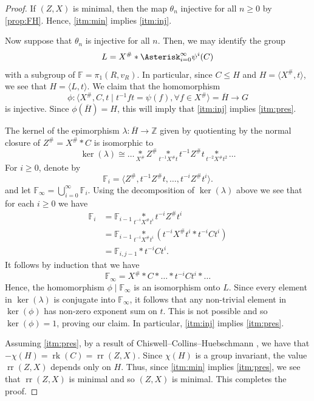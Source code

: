 \documentclass[11pt, a4paper]{amsart}
\theoremstyle{definition}
\newcommand{\isom}{\cong}
\newcommand{\F}{\mathbb{F}}
\newcommand{\Z}{\mathbb{Z}}
\DeclareMathOperator{\rk}{rk}
\DeclareMathOperator{\rr}{rr}
\begin{document}
\begin{proof}
If $(Z, X)$ is minimal, then the map $\theta_n$ injective for all $n\geqslant 0$ by \cref{prop:FH}. Hence, \cref{itm:min} implies \cref{itm:inj}.

Now suppose that $\theta_n$ is injective for all $n$. Then, we may identify the group
\[
L = X^{\#}*\Asterisk_{i=0}^{\infty}\psi^i(C)
\]
with a subgroup of $\F = \pi_1(R, v_R)$. In particular, since $C\leqslant H$ and $H = \langle X^{\#}, t\rangle$, we see that $H = \langle L, t\rangle$. We claim that the homomorphism
\[
\phi\colon \langle X^{\#}, C, t \mid t^{-1}ft = \psi(f), \forall f\in X^{\#}\rangle = \overline{H} \to G
\]
is injective. Since $\phi(\overline{H}) = H$, this will imply that \cref{itm:inj} implies \cref{itm:pres}.

The kernel of the epimorphism $\lambda\colon\overline{H}\to \Z$ given by quotienting by the normal closure of $Z^{\#} = X^{\#}*C$ is isomorphic to
\[
\ker(\lambda) \isom \ldots \underset{X^{\#}}{*}Z^{\#}\underset{t^{-1}X^{\#}t}{*}t^{-1}Z^{\#}t\underset{t^{-2}X^{\#}t^2}{*}\ldots
\]
For $i\geqslant 0$, denote by
\[
\F_{i} = \langle Z^{\#}, t^{-1}Z^{\#}t, \ldots, t^{-i}Z^{\#}t^i\rangle.
\]
and let $\F_{\infty} = \bigcup_{i=0}^{\infty}\F_i$. Using the decomposition of $\ker(\lambda)$ above we see that for each $i\geqslant 0$ we have
\begin{align*}
\F_{i} &= \F_{i-1}\underset{t^{-i}X^{\#}t^i}{*}t^{-i}Z^{\#}t^i\\
		&= \F_{i-1}\underset{t^{-i}X^{\#}t^i}{*}(t^{-i}X^{\#}t^i*t^{-i}Ct^i)\\\
		&= \F_{i, j-1}*t^{-i}Ct^i.
\end{align*}
It follows by induction that we have
\[
\F_{\infty} = X^{\#} * C* \ldots * t^{-i}Ct^i*\ldots
\]
Hence, the homomorphism $\phi\mid \F_{\infty}$ is an isomorphism onto $L$. Since every element in $\ker(\lambda)$ is conjugate into $\F_{\infty}$, it follows that any non-trivial element in $\ker(\phi)$ has non-zero exponent sum on $t$. This is not possible and so $\ker(\phi) = 1$, proving our claim. In particular, \cref{itm:inj} implies \cref{itm:pres}.

Assuming \cref{itm:pres}, by a result of Chiswell--Collins--Huebschmann \cite{CCH81}, we have that $-\chi(H) = \rk(C) = \rr(Z, X)$. Since $\chi(H)$ is a group invariant, the value $\rr(Z, X)$ depends only on $H$. Thus, since \cref{itm:min} implies \cref{itm:pres}, we see that $\rr(Z, X)$ is minimal and so $(Z, X)$ is minimal. This completes the proof.
\end{proof}
\end{document}
